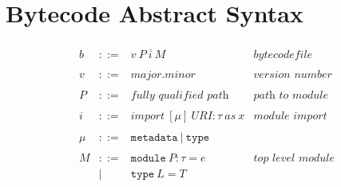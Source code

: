 \documentclass{article}
\newcommand{\keywadj}[1]{\mathtt{#1}}
\newcommand{\keyw}[1]{\keywadj{#1}~}
\begin{document}
\section{Bytecode Abstract Syntax}


\[
\begin{array}{lll}
\begin{array}{lllr}
b & ::= & v ~P ~\overline{i} ~M & bytecode file \\
  &&\\

v & ::= & \textit{major.minor} & \textit{version number} \\
  &&\\

  P & ::= & \textit{fully qualified path} & \textit{path to module} \\
  &&\\

  i & ::= & import ~[\mu] ~\textit{URI} : \tau ~as ~x & \textit{module import} \\
  &&\\

  \mu & ::= & \keyw{metadata} | ~\keyw{type} \\
  &&\\


  M & ::= & \keyw{module} P: \tau = e & \textit{top level module} \\
& | & \keyw{type} L = T & \\


  &&\\


\end{array}
\end{array}\]
\end{document}
